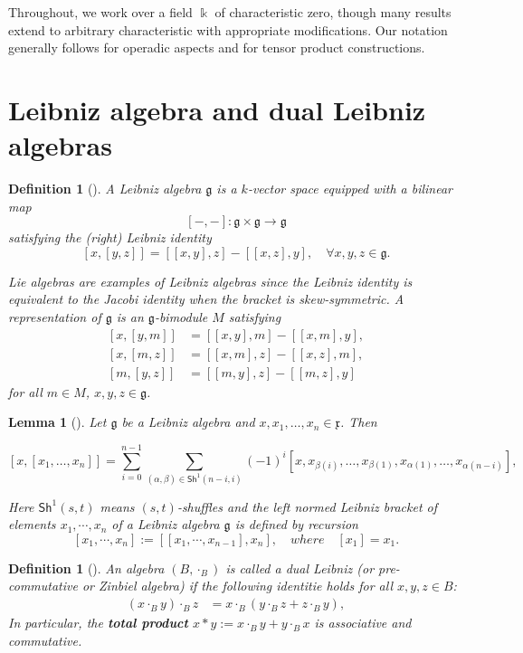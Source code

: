 \documentclass[a4paper, 12pt,oneside,reqno]{amsart}
\newtheorem{lemma}[theorem]{Lemma}
\newtheorem{definition}[theorem]{Definition}
\begin{document}
Throughout, we work over a field $\Bbbk$ of characteristic zero, though many results extend to arbitrary characteristic with appropriate modifications. Our notation generally follows \cite{Loday} for operadic aspects and \cite{Loday, GubarevKolesnikov} for tensor product constructions.

\section{Leibniz algebra and dual Leibniz  algebras}

\begin{definition}[\cite{Chapoton2001}]
A Leibniz algebra $\mathfrak{g}$ is a $k$-vector space equipped with a bilinear map
\[
[-, -]: \mathfrak{g} \times \mathfrak{g} \to \mathfrak{g}
\]
satisfying the (right) Leibniz identity
\begin{equation} \tag{1.1}
[x, [y, z]] = [[x, y], z] - [[x, z], y], \quad \forall x, y, z \in \mathfrak{g}.
\end{equation}

Lie algebras are examples of Leibniz algebras since the Leibniz identity is equivalent to the Jacobi identity when the bracket is skew-symmetric.
A representation of $\mathfrak{g}$ is an $\mathfrak{g}$-bimodule $M$ 
satisfying 
\[
\begin{aligned}
    [x, [y, m]] &= [[x, y], m] - [[x, m], y],\\
    [x, [m, z]] &= [[x, m], z] - [[x, z], m],\\ [m, [y, z]] &= [[m, y], z] - [[m, z], y]
    \end{aligned}
    \]
for all $m\in M$, $x,y,z\in \mathfrak{g}$.
\end{definition}
\begin{lemma}[\cite{I.S}]\label{lem}
  Let \(\mathfrak{g}\) be a Leibniz algebra and \(x, x_1, \dots, x_n \in \mathfrak{x}\). Then

\[
[x, [x_1, \dots, x_n]] = \sum_{i=0}^{n-1} \sum_{(\alpha,\beta) \in \mathsf{Sh}^1(n-i,i)} (-1)^i [x, x_{\beta(i)}, \dots, x_{\beta(1)}, x_{\alpha(1)}, \dots, x_{\alpha(n-i)}],
\]


Here \(\mathsf{Sh}^1(s,t)\) means \((s,t)\)-shuffles  and the left normed Leibniz  bracket of elements $x_1,\cdots,x_n$ of a Leibniz algebra  \(\mathfrak{g}\) is defined by recursion
\[
[x_1,\cdots,x_n] := [[x_1,\cdots,x_{n-1}], x_n],\quad where\quad [x_1] =x_1.
\]
  
\end{lemma}
\begin{definition}[\cite{Loday}]\label{defn:Pre-As}
An algebra $(B, \cdot_B)$ is called a dual Leibniz (or pre-commutative or Zinbiel algebra) if the following identitie holds for all $x,y,z \in B$:
\begin{align*}
(x \cdot_B y) \cdot_B z &= x \cdot_B (y \cdot_B z + z \cdot_B y), 
\end{align*}
In particular, the \textbf{total product} $x * y := x \cdot_B y + y \cdot_B x$ is associative and commutative.
\end{definition}
\end{document}
